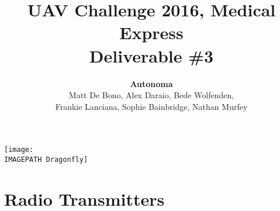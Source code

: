 \documentclass{article}
\title{UAV Challenge 2016, Medical Express\\ Deliverable \#3\\}
\author{
	\textbf{Autonoma}\\
	Matt De Bono,
	Alex Daraio,
	Bede Wolfenden,\\
	Frankie Lanciana,
	Sophie Bainbridge,
	Nathan Murfey}
\newcommand{\IMAGEPATH}{../Images/}
\begin{document}
\maketitle

\vspace{100pt}
\begin{center}
	\texttt{[image: \\IMAGEPATH Dragonfly]}
\end{center}


\clearpage

\tableofcontents

\clearpage

\section{Radio Transmitters}

\end{document}
